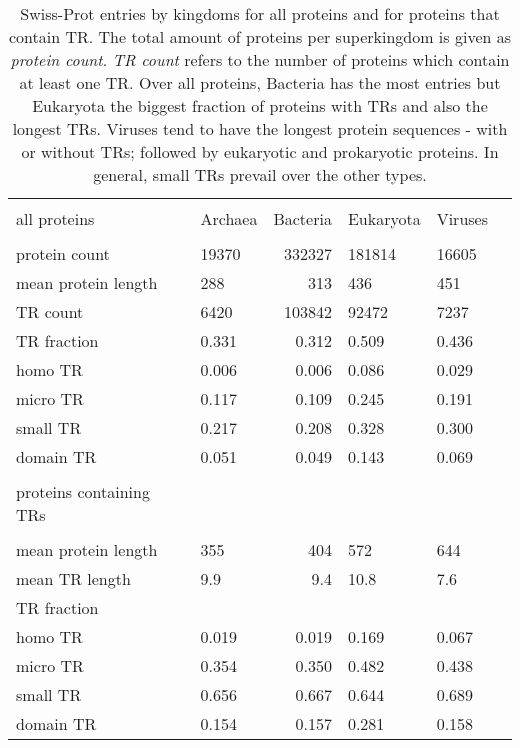 \documentclass[a4,center,fleqn]{NAR}
\begin{document}
\begin{table*}[]
\tabcolsep=0.1cm
\begin{tabular*}{\textwidth}{@{\extracolsep{\fill}}llrlll@{}}
  \hline
  \\[-0.75em] %
all proteins & Archaea & Bacteria & Eukaryota & Viruses\\ 
  \hline
  \\[-0.9em]
  protein count &  19370 & 332327 & 181814 &  16605 \\ 
  mean protein length & 288 & 313 & 436 & 451 \\ 
  TR count &   6420 & 103842 &  92472 &   7237 \\ 
  TR fraction & 0.331 & 0.312 & 0.509 & 0.436 \\ 
  \;\;\;homo TR & 0.006 & 0.006 & 0.086 & 0.029 \\
  \;\;\;micro TR & 0.117 & 0.109 & 0.245 & 0.191 \\ 
  \;\;\;small TR & 0.217 & 0.208 & 0.328 & 0.300 \\ 
  \;\;\;domain TR & 0.051 & 0.049 & 0.143 & 0.069 \\ 

  \hline
  \\[-0.75em]
proteins containing TRs   &   &   &   &   \\ 
  \hline
  \\[-0.9em]
  mean protein length & 355 & 404 & 572 & 644 \\ 
  mean TR length & 9.9 & 9.4 & 10.8 & 7.6 \\
  TR fraction &   &   &   &   \\ 
  \;\;\;homo TR & 0.019 & 0.019 & 0.169 & 0.067 \\
  \;\;\;micro TR & 0.354 & 0.350 & 0.482 & 0.438 \\ 
  \;\;\;small TR & 0.656 & 0.667 & 0.644 & 0.689 \\ 
  \;\;\;domain TR & 0.154 & 0.157 & 0.281 & 0.158 \\ 
  \hline
\end{tabular*}
\caption{Swiss-Prot entries by kingdoms for all proteins and for proteins that contain TR.
The total amount of proteins per superkingdom is given as \textit{protein count}. \textit{TR count} refers to the number of proteins which contain at least one TR. 
Over all proteins, Bacteria has the most entries but Eukaryota the biggest fraction of proteins with TRs and also the longest TRs. Viruses tend to have the longest protein sequences - with or without TRs; followed by eukaryotic and prokaryotic proteins.
In general, small TRs prevail over the other types. }
\label{tab:No_of_TR_annotations}
\end{table*}
\end{document}
